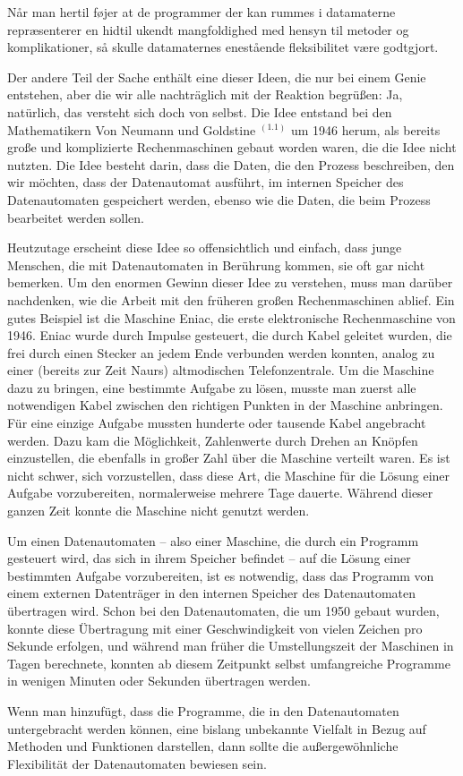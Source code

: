 {Når man hertil føjer at de programmer der kan rummes i datamaterne repræsenterer en hidtil ukendt mangfoldighed med hensyn til metoder og komplikationer, så skulle datamaternes enestående fleksibilitet være godtgjort. 
}{
Der andere Teil der Sache enthält eine dieser Ideen, die nur bei einem Genie entstehen, aber die wir alle nachträglich mit der Reaktion begrüßen: Ja, natürlich, das versteht sich doch von selbst. Die Idee entstand bei den Mathematikern Von Neumann und Goldstine $^{(1.1)}$ um 1946 herum, als bereits große und komplizierte Rechenmaschinen gebaut worden waren, die die Idee nicht nutzten. Die Idee besteht darin, dass die Daten, die den Prozess beschreiben, den wir möchten, dass der Datenautomat ausführt, im internen Speicher des Datenautomaten gespeichert werden, ebenso wie die Daten, die beim Prozess bearbeitet werden sollen.

Heutzutage erscheint diese Idee so offensichtlich und einfach, dass junge Menschen, die mit Datenautomaten in Berührung kommen, sie oft gar nicht bemerken. Um den enormen Gewinn dieser Idee zu verstehen, muss man darüber nachdenken, wie die Arbeit mit den früheren großen Rechenmaschinen ablief. Ein gutes Beispiel ist die Maschine Eniac, die erste elektronische Rechenmaschine von 1946. Eniac wurde durch Impulse gesteuert, die durch Kabel geleitet wurden, die frei durch einen Stecker an jedem Ende verbunden werden konnten, analog zu einer (bereits zur Zeit Naurs) altmodischen Telefonzentrale. Um die Maschine dazu zu bringen, eine bestimmte Aufgabe zu lösen, musste man zuerst alle notwendigen Kabel zwischen den richtigen Punkten in der Maschine anbringen. Für eine einzige Aufgabe mussten hunderte oder tausende Kabel angebracht werden. Dazu kam die Möglichkeit, Zahlenwerte durch Drehen an Knöpfen einzustellen, die ebenfalls in großer Zahl über die Maschine verteilt waren. Es ist nicht schwer, sich vorzustellen, dass diese Art, die Maschine für die Lösung einer Aufgabe vorzubereiten, normalerweise mehrere Tage dauerte. Während dieser ganzen Zeit konnte die Maschine nicht genutzt werden.

Um einen Datenautomaten -- also einer Maschine, die durch ein Programm gesteuert wird, das sich in ihrem Speicher befindet -- auf die Lösung einer bestimmten Aufgabe vorzubereiten, ist es notwendig, dass das Programm von einem externen Datenträger in den internen Speicher des Datenautomaten übertragen wird. Schon bei den Datenautomaten, die um 1950 gebaut wurden, konnte diese Übertragung mit einer Geschwindigkeit von vielen Zeichen pro Sekunde erfolgen, und während man früher die Umstellungszeit der Maschinen in Tagen berechnete, konnten ab diesem Zeitpunkt selbst umfangreiche Programme in wenigen Minuten oder Sekunden übertragen werden.

Wenn man hinzufügt, dass die Programme, die in den Datenautomaten untergebracht werden können, eine bislang unbekannte Vielfalt in Bezug auf Methoden und Funktionen darstellen, dann sollte die außergewöhnliche Flexibilität der Datenautomaten bewiesen sein.
}


